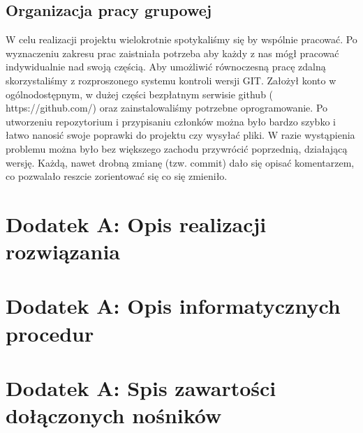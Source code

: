 \documentclass[11pt,a4paper]{article}
\begin{document}
\subsection{Organizacja pracy grupowej}
W celu realizacji projektu wielokrotnie spotykaliśmy się by wspólnie pracować. Po wyznaczeniu zakresu prac zaistniała potrzeba aby każdy z nas mógł pracować indywidualnie nad swoją częścią. Aby umożliwić równoczesną pracę zdalną skorzystaliśmy z rozproszonego systemu kontroli wersji GIT. Założył konto w ogólnodostępnym, w dużej części bezpłatnym serwisie github ( https://github.com/) oraz zainstalowaliśmy potrzebne oprogramowanie. Po utworzeniu repozytorium i przypisaniu członków można było bardzo szybko i łatwo nanosić swoje poprawki do projektu czy wysyłać pliki. W razie wystąpienia problemu można było bez większego zachodu przywrócić poprzednią, działającą wersję. Każdą, nawet drobną zmianę (tzw. commit) dało się opisać komentarzem, co pozwalało reszcie zorientować się co się zmieniło.

\section{Dodatek A: Opis realizacji rozwiązania}
\section{Dodatek A: Opis informatycznych procedur}
\section{Dodatek A: Spis zawartości dołączonych nośników}
\end{document}
